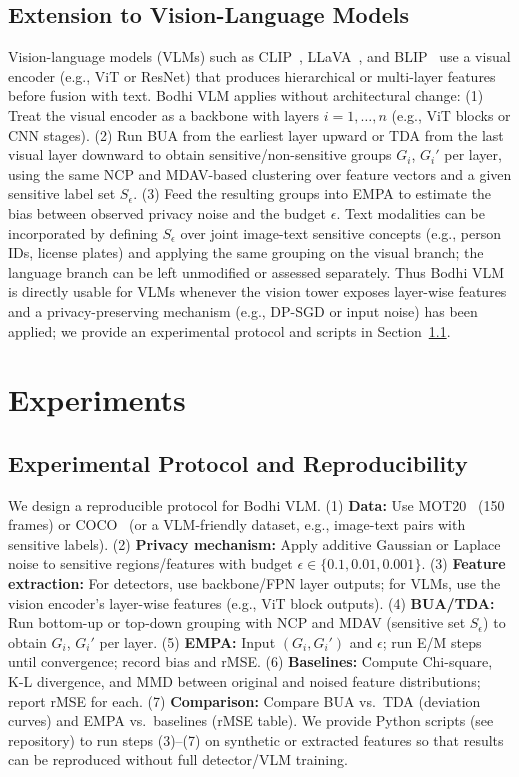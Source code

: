 \documentclass[journal]{IEEEtran}
\begin{document}
\subsection{Extension to Vision-Language Models}
\label{subsec:vlm}

Vision-language models (VLMs) such as CLIP~\cite{radford2021learning}, LLaVA~\cite{liu2023llava}, and BLIP~\cite{li2022blip} use a visual encoder (e.g., ViT or ResNet) that produces hierarchical or multi-layer features before fusion with text. Bodhi VLM applies without architectural change: (1) Treat the visual encoder as a backbone with layers $i=1,\ldots,n$ (e.g., ViT blocks or CNN stages). (2) Run BUA from the earliest layer upward or TDA from the last visual layer downward to obtain sensitive/non-sensitive groups $G_i$, $G_i'$ per layer, using the same NCP and MDAV-based clustering over feature vectors and a given sensitive label set $S_\epsilon$. (3) Feed the resulting groups into EMPA to estimate the bias between observed privacy noise and the budget $\epsilon$. Text modalities can be incorporated by defining $S_\epsilon$ over joint image-text sensitive concepts (e.g., person IDs, license plates) and applying the same grouping on the visual branch; the language branch can be left unmodified or assessed separately. Thus Bodhi VLM is directly usable for VLMs whenever the vision tower exposes layer-wise features and a privacy-preserving mechanism (e.g., DP-SGD or input noise) has been applied; we provide an experimental protocol and scripts in Section~\ref{sec:expdesign}.

\section{Experiments}
\label{sec:exp}

\subsection{Experimental Protocol and Reproducibility}
\label{sec:expdesign}

We design a reproducible protocol for Bodhi VLM. (1) \textbf{Data:} Use MOT20~\cite{dendorfer2020mot20} (150 frames) or COCO~\cite{lin2014microsoft} (or a VLM-friendly dataset, e.g., image-text pairs with sensitive labels). (2) \textbf{Privacy mechanism:} Apply additive Gaussian or Laplace noise to sensitive regions/features with budget $\epsilon \in \{0.1, 0.01, 0.001\}$. (3) \textbf{Feature extraction:} For detectors, use backbone/FPN layer outputs; for VLMs, use the vision encoder's layer-wise features (e.g., ViT block outputs). (4) \textbf{BUA/TDA:} Run bottom-up or top-down grouping with NCP and MDAV (sensitive set $S_\epsilon$) to obtain $G_i$, $G_i'$ per layer. (5) \textbf{EMPA:} Input $(G_i, G_i')$ and $\epsilon$; run E/M steps until convergence; record bias and rMSE. (6) \textbf{Baselines:} Compute Chi-square, K-L divergence, and MMD between original and noised feature distributions; report rMSE for each. (7) \textbf{Comparison:} Compare BUA vs.\ TDA (deviation curves) and EMPA vs.\ baselines (rMSE table). We provide Python scripts (see repository) to run steps (3)--(7) on synthetic or extracted features so that results can be reproduced without full detector/VLM training.
\end{document}

